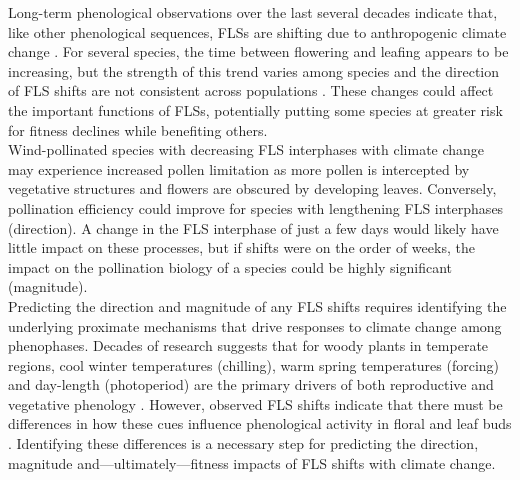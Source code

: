\documentclass[11pt]{article}
\begin{document}
\noindent Long-term phenological observations over the last several decades indicate that, like other phenological sequences, FLSs are shifting due to anthropogenic climate change \citep{Buonaiuto2020}. For several species, the time between flowering and leafing appears to be increasing, but the strength of this trend varies among species and the direction of FLS shifts are not consistent across populations \citep{Buonaiuto2020}. These changes could affect the important functions of FLSs, potentially putting some species at greater risk for fitness declines while benefiting others.\\

\noindent Wind-pollinated species with decreasing FLS interphases with climate change may experience increased pollen limitation as more pollen is intercepted by vegetative structures and flowers are obscured by developing leaves. Conversely, pollination efficiency could improve for species with lengthening FLS interphases (direction). A change in the FLS interphase of just a few days would likely have little impact on these processes, but if shifts were on the order of weeks, the impact on the pollination biology of a species could be highly significant (magnitude).\\ %

\noindent Predicting the direction and magnitude of any FLS shifts requires identifying the underlying proximate mechanisms that drive responses to climate change among phenophases. %
Decades of research suggests that for woody plants in temperate regions, cool winter temperatures (chilling), warm spring temperatures (forcing) and day-length (photoperiod) are the primary drivers of both reproductive and vegetative phenology \citep{Forrest2010,Flynn2018}. However, observed FLS shifts indicate that there must be differences in how these cues influence phenological activity in floral and leaf buds \citep{Buonaiuto2020}. %
Identifying these differences is a necessary step for predicting the direction, magnitude and---ultimately---fitness impacts of FLS shifts with climate change.\\ 
\end{document}
